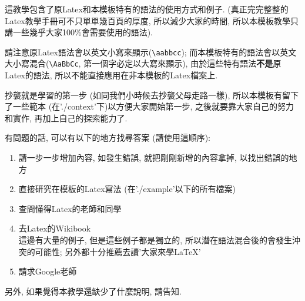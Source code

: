 

這教學包含了原Latex和本模板特有的語法的使用方式和例子. (真正完完整整的Latex教學手冊可不只單單幾百頁的厚度, 所以減少大家的時間, 所以本模板教學只講一些幾乎大家100\%會需要使用的語法). 

請注意原Latex語法會以英文小寫來顯示(\verb|\aabbcc|); 而本模板特有的語法會以英文大小寫混合(\verb|\AaBbCc|, 第一個字必定以大寫來顯示), 由於這些特有語法\textbf{不是}原Latex的語法, 所以不能直接應用在非本模板的Latex檔案上.

抄襲就是學習的第一步 (如同我們小時候去抄襲父母走路一樣), 所以本模板有留下了一些範本 (在'./context'下)以方便大家開始第一步, 之後就要靠大家自己的努力和實作, 再加上自己的探索能力了.

有問題的話, 可以有以下的地方找尋答案 (請使用這順序):
\begin{enumerate}
  \item 請一步一步增加內容, 如發生錯誤, 就把剛剛新增的內容拿掉, 以找出錯誤的地方
  \item 直接研究在模板的Latex寫法 (在'./example'以下的所有檔案)
  \item 查問懂得Latex的老師和同學
  \item 去Latex的Wikibook\\
        這邊有大量的例子, 但是這些例子都是獨立的, 所以潛在語法混合後的會發生沖突的可能性; 另外都十分推薦去讀'大家來學LaTeX' 
  \item 請求Google老師
\end{enumerate}

另外, 如果覺得本教學還缺少了什麼說明, 請告知.


\newpage
\newpage

\EndChapter

